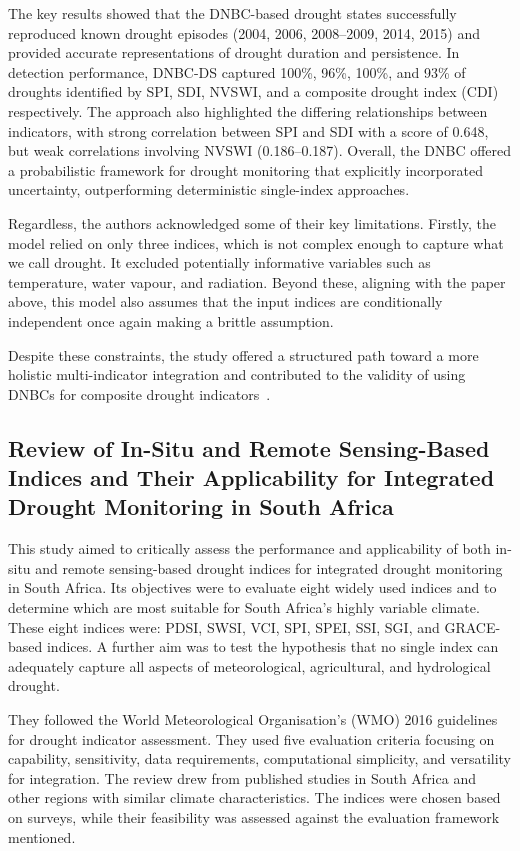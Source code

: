 The key results showed that the DNBC-based drought states successfully reproduced known drought episodes (2004, 2006, 2008–2009, 2014, 2015) and provided accurate representations of drought duration and persistence. In detection performance, DNBC-DS captured 100\%, 96\%, 100\%, and 93\% of droughts identified by SPI, SDI, NVSWI, and a composite drought index (CDI) respectively. The approach also highlighted the differing relationships between indicators, with strong correlation between SPI and SDI with a score of 0.648, but weak correlations involving NVSWI (0.186–0.187). Overall, the DNBC offered a probabilistic framework for drought monitoring that explicitly incorporated uncertainty, outperforming deterministic single-index approaches. 

Regardless, the authors acknowledged some of their key limitations. Firstly, the model relied on only three indices, which is not complex enough to capture what we call drought. It excluded potentially informative variables such as temperature, water vapour, and radiation. Beyond these, aligning with the paper above, this model also assumes that the input indices are conditionally independent once again making a brittle assumption.

Despite these constraints, the study offered a structured path toward a more holistic multi-indicator integration and contributed to the validity of using DNBCs for composite drought indicators~\cite{dnbc_drought_first}. 

\subsection*{Review of In-Situ and Remote Sensing-Based Indices and Their Applicability for Integrated Drought Monitoring in South Africa}

This study aimed to critically assess the performance and applicability of both in-situ and remote sensing-based drought indices for integrated drought monitoring in South Africa. Its objectives were to evaluate eight widely used indices and to determine which are most suitable for South Africa’s highly variable climate. These eight indices were: PDSI, SWSI, VCI, SPI, SPEI, SSI, SGI, and GRACE-based indices. A further aim was to test the hypothesis that no single index can adequately capture all aspects of meteorological, agricultural, and hydrological drought. 

They followed the World Meteorological Organisation’s (WMO) 2016 guidelines for drought indicator assessment. They used five evaluation criteria focusing on capability, sensitivity, data requirements, computational simplicity, and versatility for integration. The review drew from published studies in South Africa and other regions with similar climate characteristics. The indices were chosen based on surveys, while their feasibility was assessed against the evaluation framework mentioned. 

